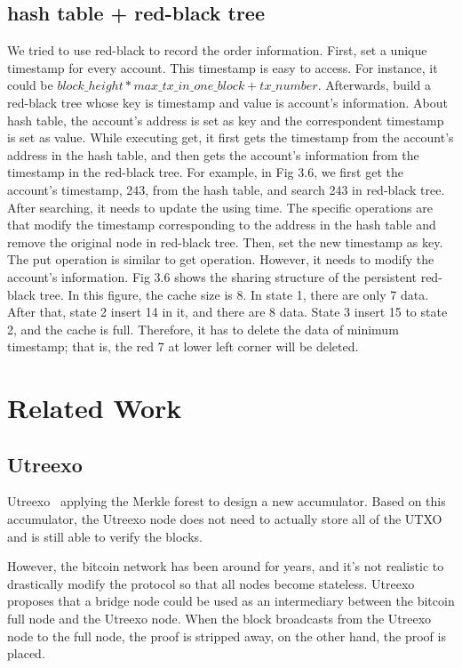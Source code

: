 \documentclass[conference]{IEEEtran}
\begin{document}
\subsection{hash table + red-black tree}
We tried to use red-black to record the order information.
First, set a unique timestamp for every account.
This timestamp is easy to access. For instance,
it could be $block\_height * max\_tx\_in\_one\_block+ tx\_number$.
Afterwards, build a red-black tree whose key is timestamp and value is account’s information. About hash table, the account's address is set as key and the correspondent timestamp is set as value.
While executing get, it first gets the timestamp from the account's address in the hash table, and then gets the account’s information from the timestamp in the red-black tree. For example, in Fig 3.6, we first get the account’s timestamp, 243, from the hash table, and search 243 in red-black tree.
After searching, it needs to update the using time. The specific operations are that modify the timestamp corresponding to the address in the hash table and remove the original node in red-black tree. Then, set the new timestamp as key. The put operation is similar to get operation. However, it needs to modify the account's information. 
Fig 3.6 shows the sharing structure of the persistent red-black tree. In this figure, the cache size is 8. In state 1, there are only 7 data. After that, state 2 insert 14 in it, and there are 8 data. State 3 insert 15 to state 2, and the cache is full. Therefore, it has to delete the data of minimum timestamp; that is, the red 7 at lower left corner will be deleted.


\section{Related Work}
\subsection{Utreexo}
Utreexo~\cite{b1} applying the Merkle forest to  design a new accumulator.
Based on this accumulator, the Utreexo node does not need to actually store all of the UTXO and is still able to verify the blocks.

However, the bitcoin network has been around for years, and it's not realistic to drastically modify the protocol so that all nodes become stateless.
Utreexo proposes that a bridge node could be used as an intermediary between the bitcoin full node and the Utreexo node.
When the block broadcasts from the Utreexo node to the full node, the proof is stripped away, on the other hand, the proof is placed.
\end{document}
